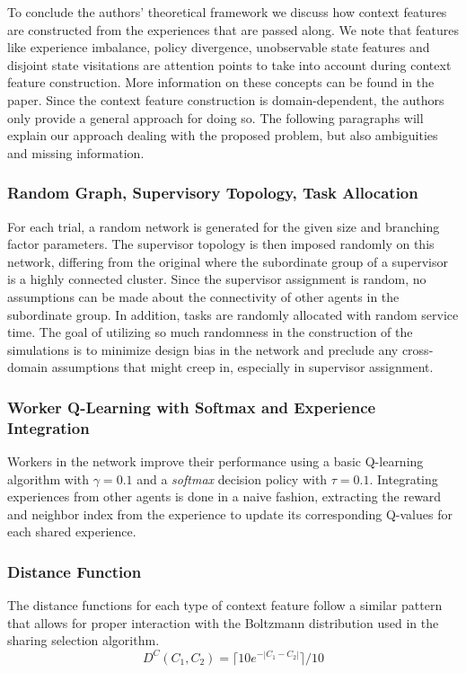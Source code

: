 \documentclass[letterpaper]{article}
\begin{document}
To conclude the authors' theoretical framework we discuss how context features are constructed from the experiences that are passed along. We note that features like experience imbalance, policy divergence, unobservable state features and disjoint state visitations are attention points to take into account during context feature construction. More information on these concepts can be found in the paper. Since the context feature construction is domain-dependent, the authors only provide a general approach for doing so. The following paragraphs will explain our approach dealing with the proposed problem, but also ambiguities and missing information.

\subsubsection{Random Graph, Supervisory Topology, Task Allocation}
For each trial, a random network is generated for the given size and branching factor parameters. The supervisor topology is then imposed randomly on this network, differing from the original where the subordinate group of a supervisor is a highly connected cluster.  Since the supervisor assignment is random, no assumptions can be made about the connectivity of other agents in the subordinate group. In addition, tasks are randomly allocated with random service time. The goal of utilizing so much randomness in the construction of the simulations is to minimize design bias in the network and preclude any cross-domain assumptions that might creep in, especially in supervisor assignment.

\subsubsection{Worker Q-Learning with Softmax and Experience Integration}
Workers in the network improve their performance using a basic Q-learning algorithm with $\gamma = 0.1$ and a \textit{softmax} decision policy with $\tau = 0.1$.  Integrating experiences from other agents is done in a naive fashion, extracting the reward and neighbor index from the experience to update its corresponding Q-values for each shared experience.

\subsubsection{Distance Function}
The distance functions for each type of context feature follow a similar pattern that allows for proper interaction with the Boltzmann distribution used in the sharing selection algorithm.
\[D^C(C_1, C_2) = \lceil 10e^{-| C_1 - C_2 |} \rceil / 10\]
\end{document}
